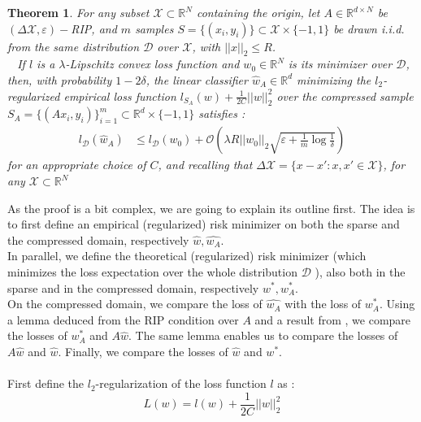 \documentclass{article}
\newcommand{\R}{\mathbb R}
\newtheorem{theorem}{Theorem}[section]
\begin{document}
\begin{theorem}\label{th1}
    For any subset $\mathcal{X}\subset \R^N$ containing the origin, 
    let $A\in \R^{d\times N}$ be $(\Delta \mathcal{X}, \varepsilon)-$RIP, and $m$ 
    samples $S=\{ (x_i, y_i)\} \subset \mathcal{X}\times \{-1, 1\}$
    be drawn i.i.d. from the same distribution $\mathcal{D}$ over 
    $\mathcal{X}$, with $||x||_2 \leq R$. \\ 
    If $l$ is a $\lambda$-Lipschitz convex loss function and $w_0\in \R^N$
    is its minimizer over $\mathcal{D}$, then, with probability
    $1-2\delta$, the linear classifier $\hat{w}_A\in \R^d$ minimizing the 
    $l_2$-regularized empirical loss function $l_{S_A}(w)+\frac{1}{2C} ||w||_2^2$
    over the compressed sample $S_A = \{(Ax_i, y_i) \}_{i=1}^m
    \subset \R^d \times \{-1, 1\} $ satisfies :
    \begin{align}
        l_{\mathcal{D}}(\hat{w}_A) &\leq 
        l_{\mathcal{D}}(w_0) + \mathcal{O}
        \left ( 
            \lambda R ||w_0||_2 \sqrt{\varepsilon + \frac{1}{m}\log\frac{1}{\delta}}
        \right )
    \end{align}
    for an appropriate choice of $C$, and recalling that
     $\Delta \mathcal{X} = \{x-x' : x, x' \in \mathcal{X} \}$, for 
     any $\mathcal{X}\subset \R^N$
\end{theorem}

    As the proof is a bit complex, we are going to explain its outline first.
    The idea is to first define an empirical (regularized) risk minimizer on both 
    the sparse and the compressed domain, respectively $\hat{w}, \hat{w_A}$.\\ 
    In parallel, we define the theoretical (regularized) risk minimizer 
    (which minimizes the loss expectation over the 
    whole distribution $\mathcal{D}$ ), also both in the sparse 
    and in the compressed domain, respectively $w^*, w_A^*$. \\
    On the compressed domain, we compare the loss of $\hat{w_A}$ with 
    the loss of $w_A^*$. Using a lemma deduced from the RIP condition over $A$
    and a result from \cite{NIPS2008_3400}, we compare the 
    losses of $w_A^*$ and $A\hat{w}$. The same lemma enables us to 
    compare the losses of $A\hat{w}$ and $\hat{w}$. Finally, 
    we compare the losses of $\hat{w}$ and $w^*$. \\ \\

    First define the $l_2$-regularization of the loss function $l$ as :
    \[L(w) = l(w) + \frac{1}{2C}||w||_2^2\]
\end{document}
